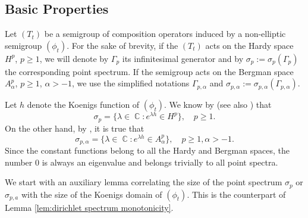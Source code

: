 \documentclass[11pt]{amsart}
\numberwithin{equation}{section}
\theoremstyle{definition}
\DeclareMathOperator{\C}{\mathbb{C}}
\begin{document}
	\subsection{Basic Properties}
	Let $(T_t)$ be a semigroup of composition operators induced by a non-elliptic semigroup $(\phi_t)$. For the sake of brevity, if the $(T_t)$ acts on the Hardy space $H^p$, $p\ge1$, we will denote by $\Gamma_p$ its infinitesimal generator and by $\sigma_p:=\sigma_p(\Gamma_p)$ the corresponding point spectrum. If the semigroup acts on the Bergman space $A_\alpha^p$, $p\ge1$, $\alpha>-1$, we use the simplified notations $\Gamma_{p,\alpha}$ and $\sigma_{p,\alpha}:=\sigma_{p,\alpha}(\Gamma_{p,\alpha})$. 
	
	Let $h$ denote the Koenigs function of $(\phi_t)$. We know by \cite[p. 9]{siskakis_review} (see also \cite{siskakis_thesis}) that
	\begin{equation}\label{eq:spectrum hardy}
		\sigma_p=\{\lambda\in\C:e^{\lambda h}\in H^p\}, \quad p\ge1.
	\end{equation}
	On the other hand, by \cite[Theorem 2]{Siskakis-Bergman}, it is true that
	\begin{equation}\label{eq:spectrum bergman}
		\sigma_{p,\alpha}=\{\lambda\in\C:e^{\lambda h}\in A_\alpha^p\}, \quad p\ge1, \alpha>-1.
	\end{equation}
	Since the constant functions belong to all the Hardy and Bergman spaces, the number $0$ is always an eigenvalue and belongs trivially to all point spectra.
	
	We start with an auxiliary lemma correlating the size of the point spectrum $\sigma_p$ or $\sigma_{p,a}$ with the size of the Koenigs domain of $(\phi_t)$. This is the counterpart of Lemma \ref{lem:dirichlet spectrum monotonicity}.
	
\end{document}

